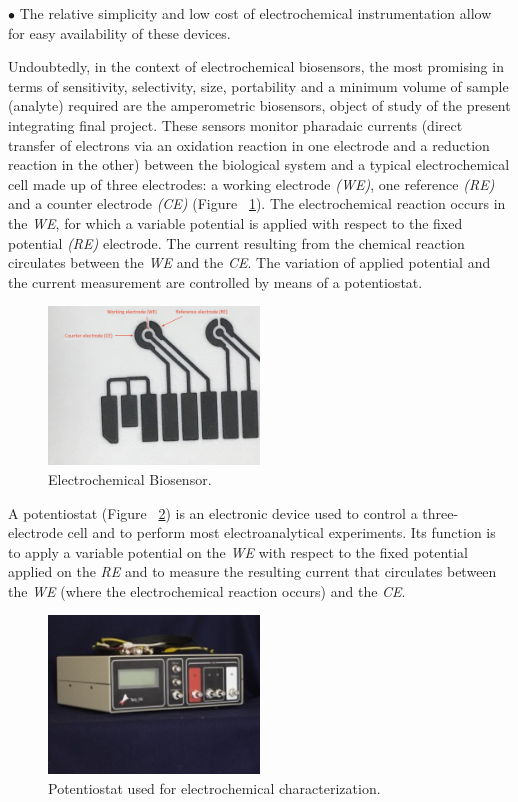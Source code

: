 $\bullet$ The relative simplicity and low cost of electrochemical instrumentation allow for easy availability of these devices.

Undoubtedly, in the context of electrochemical biosensors, the most promising in terms of sensitivity, selectivity, size, portability and a minimum volume of sample (analyte) required are the amperometric biosensors, object of study of the present integrating final project. These sensors monitor pharadaic currents (direct transfer of electrons via an oxidation reaction in one electrode and a reduction reaction in the other) between the biological system and a typical electrochemical cell made up of three electrodes: a working electrode \emph{(WE)}, one reference \emph{(RE)} and a counter electrode \emph{(CE)} (Figure ~\ref{fig:Figura_Definicion_Electrodo}). The electrochemical reaction occurs in the \emph{WE}, for which a variable potential is applied with respect to the fixed potential \emph{(RE)} electrode. The current resulting from the chemical reaction circulates between the \emph{WE} and the \emph{CE}. The variation of applied potential and the current measurement are controlled by means of a potentiostat.

\begin{figure}[H]
  \centering
    \includegraphics[width=0.5\textwidth]{Figures/Figura_Definicion_Electrodo}
  \caption{Electrochemical Biosensor.}
  \label{fig:Figura_Definicion_Electrodo}
\end{figure}

A potentiostat (Figure ~\ref{fig:Figura_potenciostato}) is an electronic device used to control a three-electrode cell and to perform most electroanalytical experiments. Its function is to apply a variable potential on the \emph{WE} with respect to the fixed potential applied on the \emph{RE} and to measure the resulting current that circulates between the \emph{WE} (where the electrochemical reaction occurs) and the \emph{CE}.

\begin{figure}[H]
  \centering
    \includegraphics[width=0.5\textwidth]{Figures/Figura_potenciostato}
  \caption{Potentiostat used for electrochemical characterization.}
  \label{fig:Figura_potenciostato}
\end{figure}

